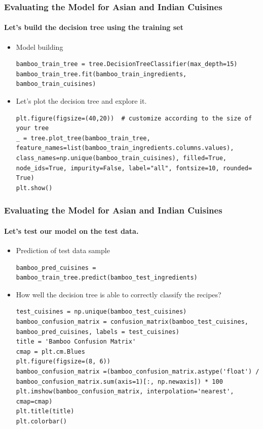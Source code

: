 \documentclass{beamer}
\begin{document}
\begin{frame}[fragile]
	\frametitle{Evaluating the Model for Asian and Indian Cuisines}
	\framesubtitle{Let's build the decision tree using the training set}
	\begin{itemize}
		\item  Model building
		\begin{lstlisting}
bamboo_train_tree = tree.DecisionTreeClassifier(max_depth=15)
bamboo_train_tree.fit(bamboo_train_ingredients, bamboo_train_cuisines)
		\end{lstlisting}
		\item Let's plot the decision tree and explore it.
		\begin{lstlisting}
plt.figure(figsize=(40,20))  # customize according to the size of your tree
_ = tree.plot_tree(bamboo_train_tree,
feature_names=list(bamboo_train_ingredients.columns.values),
class_names=np.unique(bamboo_train_cuisines), filled=True, node_ids=True, impurity=False, label="all", fontsize=10, rounded= True)
plt.show()
		\end{lstlisting}
	\end{itemize}	
\end{frame}

\begin{frame}[fragile]
	\frametitle{Evaluating the Model for Asian and Indian Cuisines}
	\framesubtitle{Let's test our model on the test data.}
	\begin{itemize}
		\item  Prediction of test data sample
		\begin{lstlisting}
bamboo_pred_cuisines = bamboo_train_tree.predict(bamboo_test_ingredients)
		\end{lstlisting}
		\item  How well the decision tree is able to correctly classify the recipes?
		\begin{lstlisting}
test_cuisines = np.unique(bamboo_test_cuisines)
bamboo_confusion_matrix = confusion_matrix(bamboo_test_cuisines, bamboo_pred_cuisines, labels = test_cuisines)
title = 'Bamboo Confusion Matrix'
cmap = plt.cm.Blues
plt.figure(figsize=(8, 6))
bamboo_confusion_matrix =(bamboo_confusion_matrix.astype('float') / bamboo_confusion_matrix.sum(axis=1)[:, np.newaxis]) * 100
plt.imshow(bamboo_confusion_matrix, interpolation='nearest', cmap=cmap)
plt.title(title)
plt.colorbar()
		\end{lstlisting}
	\end{itemize}	
\end{frame}
\end{document}
